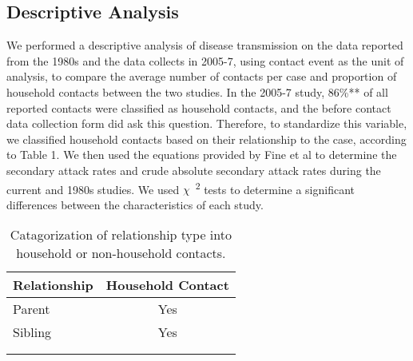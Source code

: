 \subsection{Descriptive Analysis}
We performed a descriptive analysis of disease transmission on the data reported from the 1980s and the data collects in 2005-7, using contact event as the unit of analysis, to compare the average number of contacts per case and proportion of household contacts between the two studies. In the 2005-7 study, 86\%** of all reported contacts were classified as household contacts, and the before contact data collection form did ask this question. Therefore, to standardize this variable, we classified household contacts based on their relationship to the case, according to Table 1. We then used the equations provided by Fine et al \cite{Fine1988} to determine the secondary attack rates and crude absolute secondary attack rates during the current and 1980s studies. We used $\chi$\ \textsuperscript{2} tests to determine a significant differences between the characteristics of each study.

\begin{table} 
\centering
\caption{Catagorization of relationship type into household or non-household contacts.} 
    \begin{tabular}{ l c }
    \toprule
        Relationship & Household Contact \\ 
        \midrule
        Parent & Yes \\ 
        Sibling & Yes \\ 
         &  \\ 
         &  \\ 
         \bottomrule
    \end{tabular} 
\end{table}